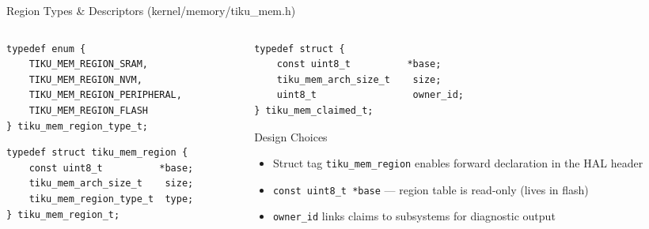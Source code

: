 \documentclass[aspectratio=169, 10pt]{beamer}
\begin{document}
\begin{frame}[fragile]{Region Types \& Descriptors (kernel/memory/tiku\_mem.h)}
\begin{columns}[T]
\begin{column}{0.48\textwidth}
\begin{lstlisting}[style=cstyle, title={Region type enum}]
typedef enum {
    TIKU_MEM_REGION_SRAM,
    TIKU_MEM_REGION_NVM,
    TIKU_MEM_REGION_PERIPHERAL,
    TIKU_MEM_REGION_FLASH
} tiku_mem_region_type_t;
\end{lstlisting}

\begin{lstlisting}[style=cstyle, title={Region descriptor}]
typedef struct tiku_mem_region {
    const uint8_t          *base;
    tiku_mem_arch_size_t    size;
    tiku_mem_region_type_t  type;
} tiku_mem_region_t;
\end{lstlisting}
\end{column}

\begin{column}{0.48\textwidth}
\begin{lstlisting}[style=cstyle, title={Claimed region (overlap tracking)}]
typedef struct {
    const uint8_t          *base;
    tiku_mem_arch_size_t    size;
    uint8_t                 owner_id;
} tiku_mem_claimed_t;
\end{lstlisting}

\vspace{0.5em}
\begin{block}{Design Choices}
\begin{itemize}
  \item Struct tag \texttt{tiku\_mem\_region} enables forward
        declaration in the HAL header
  \item \texttt{const uint8\_t *base} --- region table is
        read-only (lives in flash)
  \item \texttt{owner\_id} links claims to subsystems
        for diagnostic output
\end{itemize}
\end{block}
\end{column}
\end{columns}
\end{frame}
\end{document}
